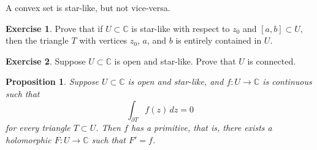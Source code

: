 \documentclass[12pt,openany]{book}
\newcommand{\C}{{\mathbb{C}}}
\theoremstyle{plain}
\newtheorem{prop}[thm]{Proposition}
\theoremstyle{remark}
\theoremstyle{definition}
\newenvironment{exbox}{%
    \def\FrameCommand{\vrule width 1pt \relax\hspace {10pt}}%
    \MakeFramed {\advance \hsize -\width \FrameRestore }%
}{%
    \endMakeFramed
}
\theoremstyle{exercise}
\newtheorem{exercise}{Exercise}[section]
\theoremstyle{example}
\begin{document}
A convex set is star-like, but not vice-versa.

\begin{exbox}
\begin{exercise} \label{exercise:triangleinstarlike}
Prove that if $U \subset \C$ is star-like with respect to $z_0$ and $[a,b]
\subset U$, then the triangle $T$ with vertices $z_0$, $a$, and $b$ is entirely
contained in $U$.
\end{exercise}

\begin{exercise}
Suppose $U \subset \C$ is open and star-like.  Prove that $U$ is connected.
\end{exercise}
\end{exbox}

\begin{prop} \label{prop:primitiveinstarlike1}
Suppose $U \subset \C$ is open and star-like,
and $f \colon U \to \C$ is continuous such that
\begin{equation*}
\int_{\partial T} f(z) \, dz = 0
\end{equation*}
for every triangle $T \subset U$.
Then $f$ has a primitive, that is,
there exists a holomorphic $F \colon U \to \C$
such that $F' = f$.
\end{prop}
\end{document}
